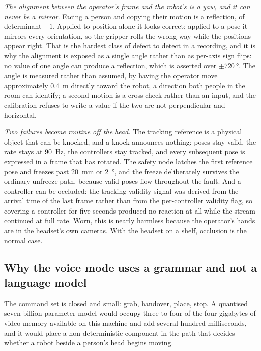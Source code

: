 \emph{The alignment between the operator's frame and the robot's is a yaw, and
it can never be a mirror.} Facing a person and copying their motion is a
reflection, of determinant $-1$. Applied to position alone it looks correct;
applied to a pose it mirrors every orientation, so the gripper rolls the wrong
way while the positions appear right. That is the hardest class of defect to
detect in a recording, and it is why the alignment is exposed as a single
angle rather than as per-axis sign flips: no value of one angle can produce a
reflection, which is asserted over $\pm\SI{720}{\degree}$. The angle is
measured rather than assumed, by having the operator move approximately
\SI{0.4}{\metre} directly toward the robot, a direction both people in the
room can identify; a second motion is a cross-check rather than an input, and
the calibration refuses to write a value if the two are not perpendicular and
horizontal.

\label{sec:vr-guards}
\emph{Two failures become routine off the head.} The tracking reference is a
physical object that can be knocked, and a knock announces nothing: poses stay
valid, the rate stays at \SI{90}{\hertz}, the controllers stay tracked, and
every subsequent pose is expressed in a frame that has rotated. The safety
node latches the first reference pose and freezes past \SI{20}{\milli\metre}
or \SI{2}{\degree}, and the freeze deliberately survives the ordinary unfreeze
path, because valid poses flow throughout the fault. And a controller can be
occluded: the tracking-validity signal was derived from the arrival time of
the last frame rather than from the per-controller validity flag, so covering
a controller for five seconds produced no reaction at all while the stream
continued at full rate. Worn, this is nearly harmless because the operator's
hands are in the headset's own cameras. With the headset on a shelf, occlusion
is the normal case.

\subsection{Why the voice mode uses a grammar and not a language model}

The command set is closed and small: grab, handover, place, stop. A quantised
seven-billion-parameter model would occupy three to four of the four gigabytes
of video memory available on this machine and add several hundred milliseconds,
and it would place a non-deterministic component in the path that decides
whether a robot beside a person's head begins moving.

